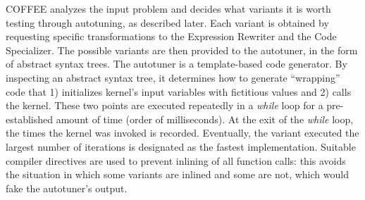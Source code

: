 COFFEE analyzes the input problem and decides what variants it is worth testing through autotuning, as described later. Each variant is obtained by requesting specific transformations to the Expression Rewriter and the Code Specializer. The possible variants are then provided to the autotuner, in the form of abstract syntax trees. The autotuner is a template-based code generator. By inspecting an abstract syntax tree, it determines how to generate ``wrapping'' code that 1) initializes kernel's input variables with fictitious values and 2) calls the kernel. These two points are executed repeatedly in a \emph{while} loop for a pre-established amount of time (order of milliseconds). At the exit of the \emph{while} loop, the times the kernel was invoked is recorded. Eventually, the variant executed the largest number of iterations is designated as the fastest implementation. Suitable compiler directives are used to prevent inlining of all function calls: this avoids the situation in which some variants are inlined and some are not, which would fake the autotuner's output. 

